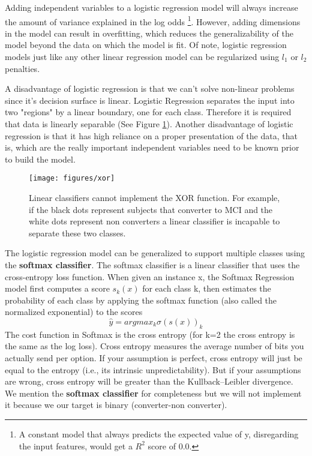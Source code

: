 \documentclass[11pt]{article}
\theoremstyle{definition}
\theoremstyle{remark}
\begin{document}
Adding independent variables to a logistic regression model will always increase the amount of variance explained in the log odds \footnote{A constant model that always predicts the expected value of y, disregarding the input features, would get a $R^2$ score of 0.0.}. However, adding dimensions in the model can result in overfitting, which reduces the generalizability of the model beyond the data on which the model is fit. Of note, logistic regression models just like any other linear regression model can be regularized using $l_1$ or $l_2$ penalties. 

A disadvantage of logistic regression is that we can’t solve non-linear problems since it’s decision surface is linear. Logistic Regression separates the input into two "regions" by a linear boundary, one for each class. Therefore it is required that data is linearly separable (See Figure \ref{fig:xor}). Another disadvantage of logistic regression is that it has high reliance on a proper presentation of the data, that is, which are the really important independent variables need to be known prior to build the model. 


\begin{figure}[H]
        \centering
        \texttt{[image: figures/xor]}
        \caption{Linear classifiers cannot implement the XOR function. For example, if the black dots represent subjects that converter to MCI  and the white dots represent non converters a linear classifier is incapable to separate these two classes.} \label{fig:xor}
\end{figure}

The logistic regression model can be generalized to support multiple classes using the \textbf{softmax classifier}. The softmax classifier is a linear classifier that uses the cross-entropy loss function. When given an instance x, the Softmax Regression model first computes a score $s_{k}(x)$ for each class k, then estimates the probability of each class by applying the softmax function (also called the normalized exponential) to the scores
\begin{equation}
\hat{y}= argmax_{k} \sigma(s(x))_k
\label{eq:softmax}
\end{equation}
The cost function in Softmax is the cross entropy (for k=2 the cross entropy is the same as the log loss). Cross entropy measures the average number of bits you actually send per option. If your assumption is perfect, cross entropy will just be equal to the entropy (i.e., its intrinsic unpredictability). But if your assumptions are wrong, cross entropy will be greater than the Kullback–Leibler divergence. We mention the \textbf{softmax classifier} for completeness but we will not implement it because we our target is binary (converter-non converter).
\end{document}
